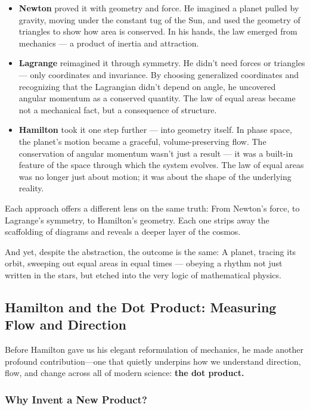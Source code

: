 \begin{itemize}
  \item \textbf{Newton} proved it with geometry and force. He imagined a planet pulled by gravity, moving under the constant tug of the Sun, and used the geometry of triangles to show how area is conserved. In his hands, the law emerged from mechanics — a product of inertia and attraction.

  \item \textbf{Lagrange} reimagined it through symmetry. He didn’t need forces or triangles — only coordinates and invariance. By choosing generalized coordinates and recognizing that the Lagrangian didn’t depend on angle, he uncovered angular momentum as a conserved quantity. The law of equal areas became not a mechanical fact, but a consequence of structure.

  \item \textbf{Hamilton} took it one step further — into geometry itself. In phase space, the planet’s motion became a graceful, volume-preserving flow. The conservation of angular momentum wasn’t just a result — it was a built-in feature of the space through which the system evolves. The law of equal areas was no longer just about motion; it was about the shape of the underlying reality.
\end{itemize}

Each approach offers a different lens on the same truth:  
From Newton’s force, to Lagrange’s symmetry, to Hamilton’s geometry.  
Each one strips away the scaffolding of diagrams and reveals a deeper layer of the cosmos.  

And yet, despite the abstraction, the outcome is the same:  
A planet, tracing its orbit, sweeping out equal areas in equal times — obeying a rhythm not just written in the stars, but etched into the very logic of mathematical physics.

\subsection{Hamilton and the Dot Product: Measuring Flow and Direction}

Before Hamilton gave us his elegant reformulation of mechanics, he made another profound contribution—one that quietly underpins how we understand direction, flow, and change across all of modern science:  
\textbf{the dot product.}

\subsubsection*{Why Invent a New Product?}

